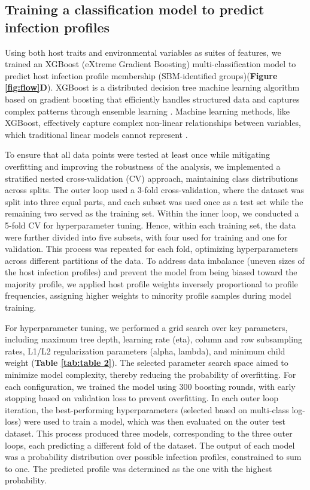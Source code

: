 \documentclass[oneside, a4paper, onecolumn, 11pt]{article}
\begin{document}
\subsection*{Training a classification model to predict infection profiles}
Using both host traits and environmental variables as suites of features, we trained an XGBoost (eXtreme Gradient Boosting) multi-classification model to predict host infection profile membership (SBM-identified groups)(\textbf{Figure \ref{fig:flow}D}). XGBoost is a distributed decision tree machine learning algorithm based on gradient boosting that efficiently handles structured data and captures complex patterns through ensemble learning \citep{Chen2016-ev}. Machine learning methods, like XGBoost, effectively capture complex non-linear relationships between variables, which traditional linear models cannot represent \citep{Lundberg2020-ro,Manley2023-qx}.

To ensure that all data points were tested at least once while mitigating overfitting and improving the robustness of the analysis, we implemented a stratified nested cross-validation (CV) approach, maintaining class distributions across splits. The outer loop used a 3-fold cross-validation, where the dataset was split into three equal parts, and each subset was used once as a test set while the remaining two served as the training set. Within the inner loop, we conducted a 5-fold CV for hyperparameter tuning. Hence, within each training set, the data were further divided into five subsets, with four used for training and one for validation. This process was repeated for each fold, optimizing hyperparameters across different partitions of the data. To address data imbalance (uneven sizes of the host infection profiles) and prevent the model from being biased toward the majority profile, we applied host profile weights inversely proportional to profile frequencies, assigning higher weights to minority profile samples during model training.

For hyperparameter tuning, we performed a grid search over key parameters, including maximum tree depth, learning rate (eta), column and row subsampling rates, L1/L2 regularization parameters (alpha, lambda), and minimum child weight (\textbf{Table \ref{tab:table 2}}). The selected parameter search space aimed to minimize model complexity, thereby reducing the probability of overfitting. For each configuration, we trained the model using 300 boosting rounds, with early stopping based on validation loss to prevent overfitting. In each outer loop iteration, the best-performing hyperparameters (selected based on multi-class log-loss) were used to train a model, which was then evaluated on the outer test dataset. This process produced three models, corresponding to the three outer loops, each predicting a different fold of the dataset. The output of each model was a probability distribution over possible infection profiles, constrained to sum to one. The predicted profile was determined as the one with the highest probability.
\end{document}
